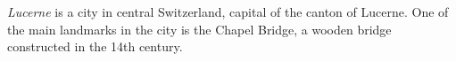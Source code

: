 \emph{Lucerne} is a city in central Switzerland, capital of the canton of Lucerne.
One of the main landmarks in the city is the Chapel Bridge, a wooden bridge constructed in the 14th century.